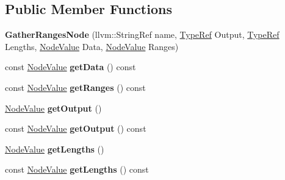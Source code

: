 \subsection*{Public Member Functions}
\begin{DoxyCompactItemize}
\item 
\mbox{\label{classglow_1_1_gather_ranges_node_a8d42386738c3d661f9e3af5bc91fcc3f}} 
{\bfseries Gather\+Ranges\+Node} (llvm\+::\+String\+Ref name, \hyperlink{structglow_1_1_type}{Type\+Ref} Output, \hyperlink{structglow_1_1_type}{Type\+Ref} Lengths, \hyperlink{structglow_1_1_node_value}{Node\+Value} Data, \hyperlink{structglow_1_1_node_value}{Node\+Value} Ranges)
\item 
\mbox{\label{classglow_1_1_gather_ranges_node_a646e100e9a3ce087001d01c0d55f65ff}} 
const \hyperlink{structglow_1_1_node_value}{Node\+Value} {\bfseries get\+Data} () const
\item 
\mbox{\label{classglow_1_1_gather_ranges_node_acd2f15d34f89713d32425d90471f3a34}} 
const \hyperlink{structglow_1_1_node_value}{Node\+Value} {\bfseries get\+Ranges} () const
\item 
\mbox{\label{classglow_1_1_gather_ranges_node_ad123c2d7d6160fd0cfd5f55cff5218df}} 
\hyperlink{structglow_1_1_node_value}{Node\+Value} {\bfseries get\+Output} ()
\item 
\mbox{\label{classglow_1_1_gather_ranges_node_a604a7bdafe2df7ca9b92b72efed31b8a}} 
const \hyperlink{structglow_1_1_node_value}{Node\+Value} {\bfseries get\+Output} () const
\item 
\mbox{\label{classglow_1_1_gather_ranges_node_af6040e16573a8eb421641609b0a6071f}} 
\hyperlink{structglow_1_1_node_value}{Node\+Value} {\bfseries get\+Lengths} ()
\item 
\mbox{\label{classglow_1_1_gather_ranges_node_ab86cd71f4aa0dc98a1b48c41e8889806}} 
const \hyperlink{structglow_1_1_node_value}{Node\+Value} {\bfseries get\+Lengths} () const
\item 
\mbox{\label{classglow_1_1_gather_ranges_node_ac121114ba3f659cd2edb079918045b5f}} 

\end{DoxyCompactItemize}
